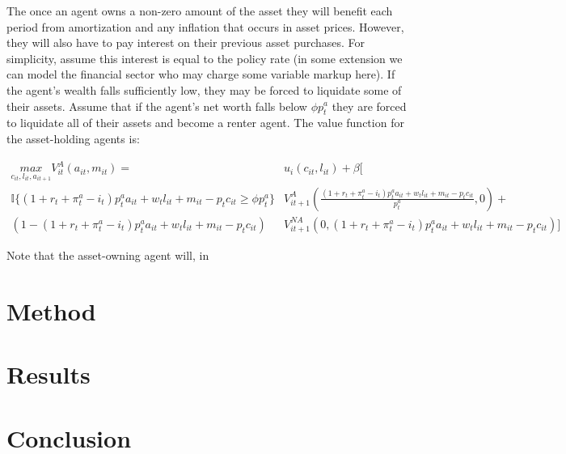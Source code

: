 \documentclass{article}
\begin{document}
The once an agent owns a non-zero amount of the asset they will benefit each period from amortization and any inflation that occurs in asset prices. However, they will also have to pay interest on their previous asset purchases. For simplicity, assume this interest is equal to the policy rate (in some extension we can model the financial sector who may charge some variable markup here). If the agent's wealth falls sufficiently low, they may be forced to liquidate some of their assets. Assume that if the agent's net worth falls below $\phi p^a_t$ they are forced to liquidate all of their assets and become a renter agent. The value function for the asset-holding agents is:

\begin{align}
  \underset{c_{it}, l_{it}, a_{it+1}}{max} V^{A}_{it}(a_{it}, m_{it}) = &u_{i}(c_{it}, l_{it}) + \beta [  \nonumber \\ 
  \mathbb{I}\{ \left( 1 + r_t + \pi^a_t - i_t \right) p^a_t a_{it} + w_t l_{it} + m_{it} - p_t c_{it} \geq \phi p^a_t \} &V^A_{it+1}(\frac{\left( 1 + r_t + \pi^a_t - i_t \right) p^a_t a_{it} + w_t l_{it} + m_{it} - p_t c_{it}}{p^a_t}, 0) + \nonumber \\ 
  \left(1 - \left( 1 + r_t + \pi^a_t - i_t \right) p^a_t a_{it} + w_t l_{it} + m_{it} - p_t c_{it} \right) &V^{NA}_{it+1}(0, \left( 1 + r_t + \pi^a_t - i_t \right) p^a_t a_{it} + w_t l_{it} + m_{it} - p_t c_{it})] \label{va}
\end{align}

Note that the asset-owning agent will, in 

\section{Method} \label{method}

\section{Results} \label{results}

\section{Conclusion} \label{conclusion}


\newpage
\printbibliography
\end{document}
